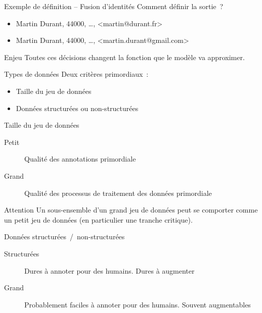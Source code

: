 \begin{frame}{Exemple de définition – Fusion d'identités}
  Comment définir la sortie~?
  \begin{itemize}
    \item Martin Durant, 44000, …, <martin@durant.fr>
    \item Martin Durant, 44000, …, <martin.durant@gmail.com>
  \end{itemize}
\end{frame}

\begin{frame}{Enjeu}
  Toutes ces décisions changent la fonction que le modèle va approximer.
\end{frame}

\begin{frame}{Types de données}
  Deux critères primordiaux~:

  \begin{itemize}
    \item Taille du jeu de données
    \item Données structurées ou non-structurées
  \end{itemize}
\end{frame}

\begin{frame}{Taille du jeu de données}
  \begin{description}
    \item[Petit] Qualité des annotations primordiale
    \item[Grand] Qualité des processus de traitement des données primordiale
  \end{description}

  \begin{block}{Attention}
    Un sous-ensemble d'un grand jeu de données peut se comporter comme un petit jeu de données (en particulier une tranche critique).
  \end{block}
\end{frame}

\begin{frame}{Données structurées~/~non-structurées}
  \begin{description}
    \item[Structurées] Dures à annoter pour des humains. Dures à augmenter
    \item[Grand] Probablement faciles à annoter pour des humains. Souvent augmentables
  \end{description}
\end{frame}

